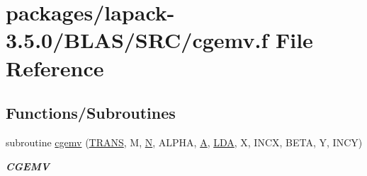 \hypertarget{lapack-3_85_80_2BLAS_2SRC_2cgemv_8f}{}\section{packages/lapack-\/3.5.0/\+B\+L\+A\+S/\+S\+R\+C/cgemv.f File Reference}
\label{lapack-3_85_80_2BLAS_2SRC_2cgemv_8f}
\subsection*{Functions/\+Subroutines}
\begin{DoxyCompactItemize}
\item 
subroutine \hyperlink{group__complex__blas__level2_ga0983da08821bec7701e90fb1e65c8cd7}{cgemv} (\hyperlink{superlu__enum__consts_8h_a0c4e17b2d5cea33f9991ccc6a6678d62a1f61e3015bfe0f0c2c3fda4c5a0cdf58}{T\+R\+A\+N\+S}, M, \hyperlink{polmisc_8c_a0240ac851181b84ac374872dc5434ee4}{N}, A\+L\+P\+H\+A, \hyperlink{classA}{A}, \hyperlink{example__user_8c_ae946da542ce0db94dced19b2ecefd1aa}{L\+D\+A}, X, I\+N\+C\+X, B\+E\+T\+A, Y, I\+N\+C\+Y)
\begin{DoxyCompactList}\small\item\em {\bfseries C\+G\+E\+M\+V} \end{DoxyCompactList}\end{DoxyCompactItemize}
